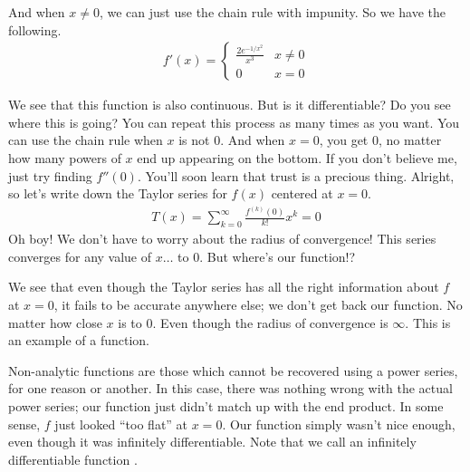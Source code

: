 \documentclass{ximera}
\begin{document}
\begin{exercise}
\begin{exercise}
		\begin{exercise}
			And when $x \neq 0$, we can just use the chain rule with impunity. So we have the following.
			\begin{align*}
				f'(x)= 
				\begin{cases}
				\frac{2e^{-1/x^2}}{x^3}  &x \neq 0 \\
				0 &x=0
				\end{cases}
			\end{align*}
		
			We see that this function is also continuous. But is it differentiable? Do you see where this is going? You can repeat this process as many times as you want. You can use the chain rule when $x$ is not $0$. And when $x=0$, you get $0$, no matter how many powers of $x$ end up appearing on the bottom. If you don't believe me, just try finding $f''(0)$. You'll soon learn that trust is a precious thing. Alright, so let's write down the Taylor series for $f(x)$ centered at $x=0$.
			\begin{align*}
				T(x) = \sum_{k=0}^{\infty} \frac{f^{(k)}(0)}{k!} x^k = 0
			\end{align*}
			Oh boy! We don't have to worry about the radius of convergence! This series converges for any value of $x\ldots$ to $0$. But where's our function!?
			
			We see that even though the Taylor series has all the right information about $f$ at $x=0$, it fails to be accurate anywhere else; we don't get back our function. No matter how close $x$ is to 0. Even though the radius of convergence is $\infty$. This is an example of a  function. 
			
			Non-analytic functions are those which cannot be recovered using a power series, for one reason or another. In this case, there was nothing wrong with the actual power series; our function just didn't match up with the end product. In some sense, $f$ just looked ``too flat'' at $x=0$. Our function simply wasn't nice enough, even though it was infinitely differentiable. Note that we call an infinitely differentiable function .
			

\end{exercise}
\end{exercise}
\end{exercise}
\end{document}
